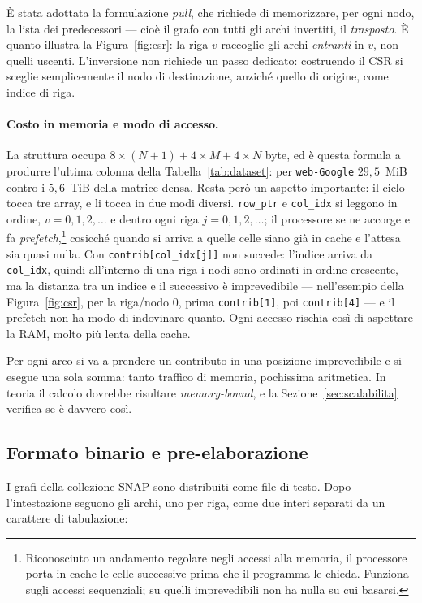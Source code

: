 \documentclass[11pt,a4paper]{article}
\newcommand{\stacco}{\par\medskip\noindent}
\begin{document}
È stata adottata la formulazione \emph{pull}, che richiede di memorizzare,
per ogni nodo, la lista dei predecessori --- cioè il grafo con tutti gli
archi invertiti, il \emph{trasposto}. È quanto illustra la
Figura~\ref{fig:csr}: la riga $v$ raccoglie gli archi \emph{entranti} in $v$,
non quelli uscenti. L'inversione non richiede un passo dedicato: costruendo il
CSR si sceglie semplicemente il nodo di destinazione, anziché quello di
origine, come indice di riga.

\paragraph{Costo in memoria e modo di accesso.}
La struttura occupa $8 \times (N{+}1) + 4 \times M + 4 \times N$ byte, ed è
questa formula a produrre l'ultima colonna della Tabella~\ref{tab:dataset}:
per \texttt{web-Google} $29{,}5$~MiB contro i $5{,}6$~TiB della matrice densa.
Resta però un aspetto importante: il ciclo tocca tre array, e li tocca in due
modi diversi. \texttt{row\_ptr} e \texttt{col\_idx} si leggono in ordine,
$v = 0, 1, 2, \dots$ e dentro ogni riga $j = 0, 1, 2, \dots$; il processore se
ne accorge e fa \emph{prefetch},\footnote{Riconosciuto un andamento regolare
negli accessi alla memoria, il processore porta in cache le celle successive
prima che il programma le chieda. Funziona sugli accessi sequenziali; su
quelli imprevedibili non ha nulla su cui basarsi.} cosicché quando si arriva a
quelle celle siano già in cache e l'attesa sia quasi nulla. Con
\texttt{contrib[col\_idx[j]]} non succede: l'indice arriva da
\texttt{col\_idx}, quindi all'interno di una riga i nodi sono ordinati in ordine 
crescente, ma la distanza tra un indice e il successivo è imprevedibile --- nell'esempio
della Figura~\ref{fig:csr}, per la riga/nodo 0, prima \texttt{contrib[1]}, poi \texttt{contrib[4]}
--- e il prefetch non ha modo di indovinare quanto. Ogni
accesso rischia così di aspettare la RAM, molto più lenta della cache.

\stacco
Per ogni arco si va a prendere un contributo in una posizione imprevedibile e
si esegue una sola somma: tanto traffico di memoria, pochissima aritmetica.
In teoria il calcolo dovrebbe risultare \emph{memory-bound}, e la
Sezione~\ref{sec:scalabilita} verifica se è davvero così.

\subsection{Formato binario e pre-elaborazione}
I grafi della collezione SNAP sono distribuiti come file di testo.
Dopo l'intestazione seguono gli archi, uno per riga,
come due interi separati da un carattere di tabulazione:
\end{document}
